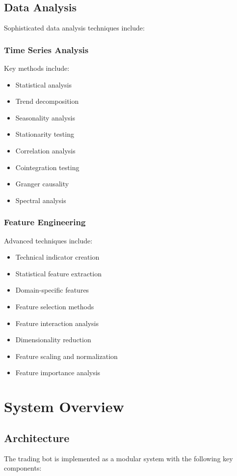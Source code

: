 \documentclass[conference]{IEEEtran}
\begin{document}
\subsection{Data Analysis}
Sophisticated data analysis techniques include:

\subsubsection{Time Series Analysis}
Key methods include:
\begin{itemize}
    \item Statistical analysis
    \item Trend decomposition
    \item Seasonality analysis
    \item Stationarity testing
    \item Correlation analysis
    \item Cointegration testing
    \item Granger causality
    \item Spectral analysis
\end{itemize}

\subsubsection{Feature Engineering}
Advanced techniques include:
\begin{itemize}
    \item Technical indicator creation
    \item Statistical feature extraction
    \item Domain-specific features
    \item Feature selection methods
    \item Feature interaction analysis
    \item Dimensionality reduction
    \item Feature scaling and normalization
    \item Feature importance analysis
\end{itemize}

\section{System Overview}
\subsection{Architecture}
The trading bot is implemented as a modular system with the following key components:
\end{document}
